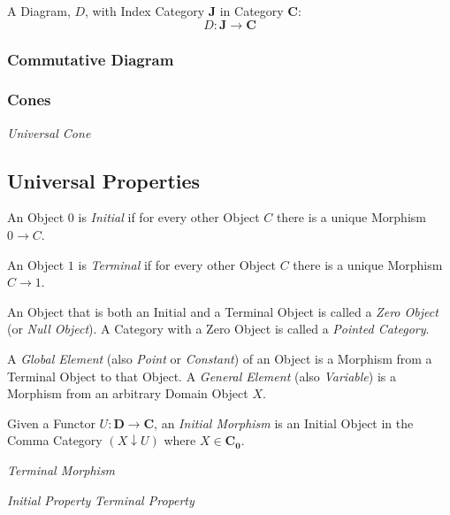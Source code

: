 A Diagram, $D$, with Index Category $\mathbf{J}$ in Category
$\mathbf{C}$:
\[
    D : \mathbf{J} \rightarrow \mathbf{C}
\]

\subsubsection{Commutative Diagram}\label{subsec:commutative_diagram}

\subsubsection{Cones}\label{subsec:category_cone}

\emph{Universal Cone}

\subsection{Universal Properties}\label{subsec:universal_property}

An Object $0$ is \emph{Initial} if for every other Object $C$ there is
a unique Morphism $0 \rightarrow C$.

An Object $1$ is \emph{Terminal} if for every other Object $C$ there
is a unique Morphism $C \rightarrow 1$.

An Object that is both an Initial and a Terminal Object is called a
\emph{Zero Object} (or \emph{Null Object}). A Category with a Zero
Object is called a \emph{Pointed Category}.

A \emph{Global Element} (also \emph{Point} or \emph{Constant}) of an
Object is a Morphism from a Terminal Object to that Object. A
\emph{General Element} (also \emph{Variable}) is a Morphism from an
arbitrary Domain Object $X$.

Given a Functor $U: \mathbf{D} \rightarrow \mathbf{C}$, an
\emph{Initial Morphism} is an Initial Object in the Comma Category $(X
\downarrow U)$ where $X \in \mathbf{C_0}$.

\emph{Terminal Morphism}

\emph{Initial Property} \emph{Terminal Property}

